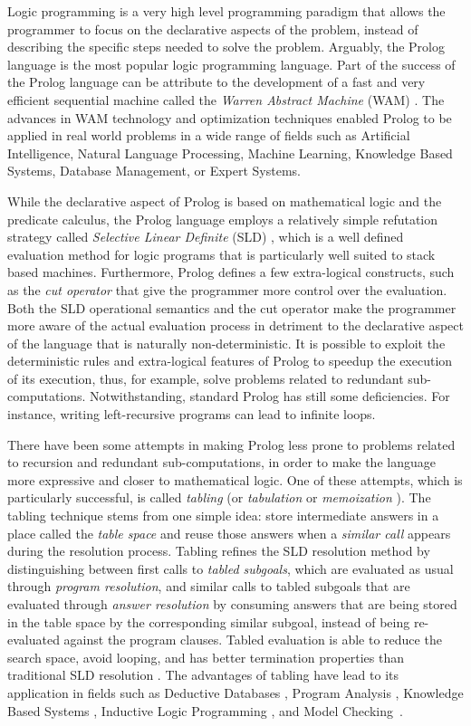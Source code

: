 Logic programming is a very high level programming paradigm that allows the programmer
to focus on the declarative aspects of the problem, instead of describing the specific steps
needed to solve the problem. Arguably, the Prolog language is the most popular logic
programming language. Part of the success of the Prolog language can be attribute to the
development of a fast and very efficient sequential machine called the \emph{Warren Abstract Machine}
(WAM) \cite{Warren-83}. The advances in WAM technology and optimization techniques enabled Prolog
to be applied in real world problems in a wide range of fields such as Artificial Intelligence,
Natural Language Processing, Machine Learning, Knowledge Based Systems, Database Management, or
Expert Systems.

While the declarative aspect of Prolog is based on mathematical logic and the predicate calculus,
the Prolog language employs a relatively simple refutation strategy called \emph{Selective Linear Definite}
(SLD) \cite{Lloyd-87}, which is a well defined evaluation method for logic programs that
is particularly well suited to stack based machines.
Furthermore, Prolog defines a few extra-logical constructs, such as the \emph{cut operator}
that give the programmer more control over the evaluation. Both the SLD operational semantics
and the cut operator make the programmer more aware of the actual evaluation process in detriment to the
declarative aspect of the language that is naturally non-deterministic. It is possible to exploit
the deterministic rules and extra-logical features of Prolog to speedup the execution of its execution,
thus, for example, solve problems related to redundant sub-computations. Notwithstanding, standard Prolog has
still some deficiencies. For instance, writing left-recursive programs can lead to infinite loops.

There have been some attempts in making Prolog less prone to problems related to recursion
and redundant sub-computations, in order to make the language more expressive and closer to mathematical logic.
One of these attempts, which is particularly successful, is called \emph{tabling}
(or \emph{tabulation} or \emph{memoization} \cite{Michie-68}). The tabling technique stems from one simple idea:
store intermediate answers in a place called the \emph{table space} and reuse those answers when a
\emph{similar call} appears during the resolution process. Tabling refines the SLD resolution method
by distinguishing between first calls to \emph{tabled subgoals}, which are evaluated as usual through
\emph{program resolution}, and similar calls to tabled subgoals that are evaluated through \emph{answer resolution}
by consuming answers that are being stored in the table space by the corresponding similar subgoal, instead
of being re-evaluated against the program clauses. Tabled evaluation is able to reduce the search space,
avoid looping, and has better termination properties than traditional SLD resolution \cite{Chen-96}.
The advantages of tabling have lead to its application in fields such as Deductive Databases \cite{Sagonas-94},
Program Analysis \cite{RamakrishnanCR-00}, Knowledge Based Systems \cite{Yang-00}, Inductive Logic
Programming \cite{Rocha-05b}, and Model Checking~\cite{RamakrishnanCR-00}.

